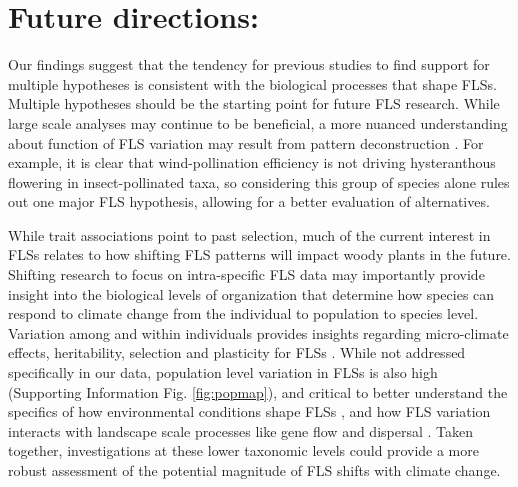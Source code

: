 \documentclass[11pt]{article}
\begin{document}
{\section*{Future directions:}
\noindent Our findings suggest that the tendency for previous studies to find support for multiple hypotheses \citep{Bolmgren2003,Gougherty2018,Savage2019} is consistent with the biological processes that shape FLSs. Multiple hypotheses should be the starting point for future FLS research. While large scale analyses may continue to be beneficial, a more nuanced understanding about function of FLS variation may result from pattern deconstruction \citep[i.e. grouping of species according to sub-clades or trait commonalities,][]{Terribile2009}. For example,%
it is clear that wind-pollination efficiency is not driving hysteranthous flowering in insect-pollinated taxa, so considering this group of species alone rules out one major FLS hypothesis, allowing for a better evaluation of alternatives. 

\noindent While trait associations point to past selection, much of the current interest in FLSs relates to how shifting FLS patterns will impact woody plants in the future. Shifting research to focus on intra-specific FLS data may importantly provide insight into the biological levels of organization that determine how species can respond to climate change from the individual to population to species level. Variation among and within individuals provides insights regarding  micro-climate effects, heritability, selection and plasticity for FLSs \citep{Denechere2019}.  While not addressed specifically in our data, population level variation in FLSs is also high (Supporting Information Fig. \ref{fig:popmap}), and critical to better understand the specifics of how environmental conditions shape FLSs \citep{Vitasse2009}, and how FLS variation interacts with landscape scale processes like gene flow and dispersal \citep{Manel2003}. Taken together, investigations at these lower taxonomic levels could provide a more robust assessment of the potential magnitude of FLS shifts with climate change.\\

}
\end{document}
